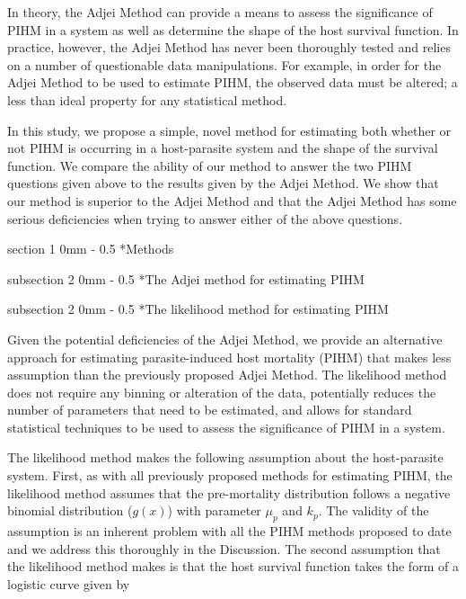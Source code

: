 \documentclass[12pt, a4paper]{article}
\makeatletter
\renewcommand{\section}{\@startsection
{section}%
{1}%
{0mm}%
{-\baselineskip}%
{0.5\baselineskip}%
{\normalfont\bf\large}} %
\renewcommand{\subsection}{\@startsection
{subsection}%
{2}%
{0mm}%
{-\baselineskip}%
{0.5\baselineskip}%
{\normalfont\bf}} %
\makeatother
\begin{document}
In theory, the Adjei Method can provide a means to assess the significance of
PIHM in a system as well as determine the shape of the host survival function.
In practice, however, the Adjei Method has never been thoroughly tested and
relies on a number of questionable data manipulations.  For example, in order
for the Adjei Method to be used to estimate PIHM, the observed data must be
altered; a less than ideal property for any statistical method.

In this study, we propose a simple, novel method for estimating both whether or
not PIHM is occurring in a host-parasite system and the shape of the survival
function.  We compare the ability of our method to answer the two PIHM
questions given above to the results given by the Adjei Method.  We show that
our method is superior to the Adjei Method and that the Adjei Method has some
serious deficiencies when trying to answer either of the above questions.

\section*{Methods}

\subsection*{The Adjei method for estimating PIHM}



\subsection*{The likelihood method for estimating PIHM}

Given the potential deficiencies of the Adjei Method, we provide an alternative
approach for estimating parasite-induced host mortality (PIHM) that makes less
assumption than the previously proposed Adjei Method.  The likelihood method
does not require any binning or alteration of the data, potentially reduces the
number of parameters that need to be estimated, and allows for standard
statistical techniques to be used to assess the significance of PIHM in a
system.

The likelihood method makes the following assumption about the host-parasite
system. First, as with all previously proposed methods for estimating PIHM, the
likelihood method assumes that the pre-mortality distribution follows a
negative binomial distribution ($g(x)$) with parameter $\mu_p$ and $k_p$. The
validity of the assumption is an inherent problem with all the PIHM methods
proposed to date and we address this thoroughly in the Discussion. The second
assumption that the likelihood method makes is that the host survival function
takes the form of a logistic curve given by
\end{document}
